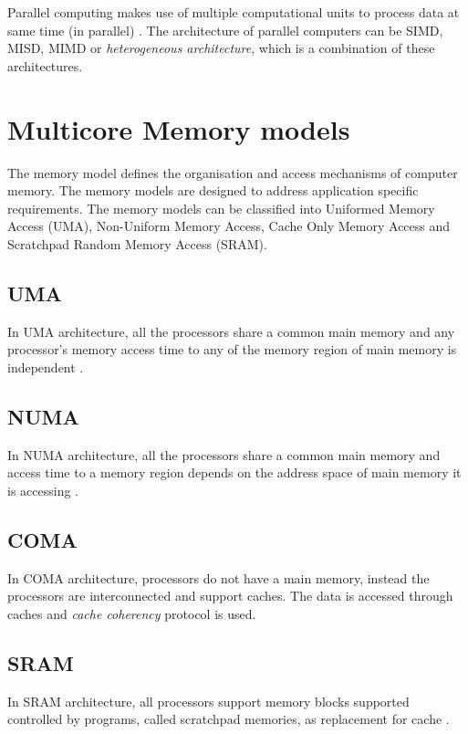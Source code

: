 Parallel computing makes use of multiple computational units to process data at same time (in parallel) \cite{hennessy2011computer}. The architecture of parallel computers can be SIMD, MISD, MIMD or \emph{heterogeneous architecture}, which is a combination of these architectures.


\section{Multicore Memory models}

The memory model defines the organisation and access mechanisms of computer memory. The memory models are designed to address application specific requirements. The memory models can be classified into Uniformed Memory Access (UMA), Non-Uniform Memory Access, Cache Only Memory Access and Scratchpad Random Memory Access (SRAM).

\subsection{UMA}

In UMA architecture, all the processors share a common main memory and any processor's memory access time to any of the memory region of main memory is independent \cite{hennessy2011computer}.

\subsection{NUMA}

In NUMA architecture, all the processors share a common main memory and access time to a memory region depends on the address space of main memory it is accessing \cite{hennessy2011computer}.

\subsection{COMA}

In COMA architecture, processors do not have a main memory, instead the processors are interconnected and support caches. The data is accessed through caches and \emph{cache coherency} protocol is used.\cite{hagersten1992ddm, hennessy2011computer}

\subsection{SRAM}

In SRAM architecture, all processors support memory blocks supported controlled by programs, called scratchpad memories, as replacement for cache \cite{hennessy2011computer}.

